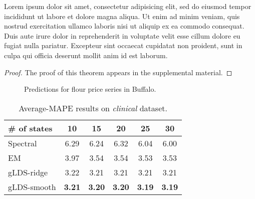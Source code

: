 \documentclass[twoside,leqno,twocolumn]{article}
\begin{document}
\begin{theorem}
\label{thm:lip}
Lorem ipsum dolor sit amet, consectetur adipisicing elit, sed do eiusmod
tempor incididunt ut labore et dolore magna aliqua. Ut enim ad minim veniam,
quis nostrud exercitation ullamco laboris nisi ut aliquip ex ea commodo
consequat. Duis aute irure dolor in reprehenderit in voluptate velit esse
cillum dolore eu fugiat nulla pariatur. Excepteur sint occaecat cupidatat non
proident, sunt in culpa qui officia deserunt mollit anim id est laborum.
\end{theorem}

\begin{proof}
The proof of this theorem appears in the supplemental material.
\end{proof}

\begin{figure}[!htbp]
\centering
\caption{Predictions for flour price series in Buffalo.}
\label{fig:flour_buffalo}
\end{figure}



\begin{table}[!hptb]
\caption{Average-MAPE results on \emph{clinical} dataset.}
\centering
\begin{tabular}{@{}lccccc@{}} \toprule
\label{tab:clinical_mape}
  \#  of states & 10 & 15  & 20 & 25 & 30   \\ \midrule
Spectral & 6.29 & 6.24 & 6.32 & 6.04 & 6.00  \\
EM & 3.97 & 3.54 & 3.54 & 3.53 & 3.53  \\
gLDS-ridge & 3.22 & 3.21 & 3.21 & 3.21 & 3.21  \\
gLDS-smooth & \textbf{3.21} & \textbf{3.20} & \textbf{3.20} & \textbf{3.19} & \textbf{3.19}  \\ \bottomrule
\end{tabular}
\end{table}




\end{document}
